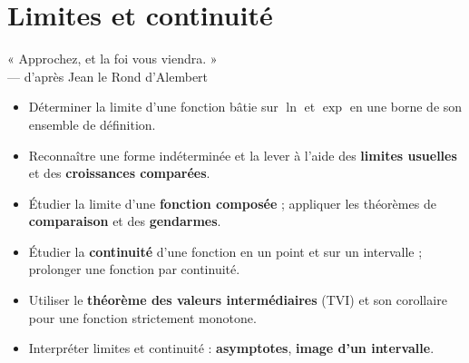
\chapter{Limites et continuité}

\begin{citationchapitre}
	« Approchez, et la foi vous viendra. »\\[0.4em]
	— d'après Jean le Rond d'Alembert
\end{citationchapitre}

\begin{objectifs}
	\begin{itemize}[label=\textbullet]
		\item Déterminer la limite d'une fonction bâtie sur $\ln$ et $\exp$
		en une borne de son ensemble de définition.
		\item Reconnaître une forme indéterminée et la lever à l'aide des
		\textbf{limites usuelles} et des \textbf{croissances comparées}.
		\item Étudier la limite d'une \textbf{fonction composée} ; appliquer les
		théorèmes de \textbf{comparaison} et des \textbf{gendarmes}.
		\item Étudier la \textbf{continuité} d'une fonction en un point et sur un
		intervalle ; prolonger une fonction par continuité.
		\item Utiliser le \textbf{théorème des valeurs intermédiaires} (TVI) et son
		corollaire pour une fonction strictement monotone.
		\item Interpréter limites et continuité : \textbf{asymptotes}, \textbf{image
		d'un intervalle}.
	\end{itemize}
\end{objectifs}


